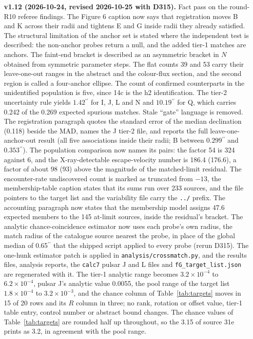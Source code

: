 \documentclass[11pt]{article}
\newcommand{\as}{\ensuremath{^{\prime\prime}}}
\begin{document}
\textbf{v1.12 (2026-10-24, revised 2026-10-25 with D315).} Fact pass on the round-R10 referee findings. The Figure 6 caption now says that registration moves B and K across their radii and tightens E and G inside radii they already satisfied. The structural limitation of the anchor set is stated where the independent test is described: the non-anchor probes return a null, and the added tier-1 matches are anchors. The faint-end bracket is described as an asymmetric bracket in $N$ obtained from symmetric parameter steps. The flat counts 39 and 53 carry their leave-one-out ranges in the abstract and the colour-flux section, and the second region is called a four-anchor ellipse. The count of confirmed counterparts in the unidentified population is five, since 14c is the h2 identification. The tier-2 uncertainty rule yields $1.42\as$ for I, J, L and N and $10.19\as$ for Q, which carries 0.242 of the 0.269 expected spurious matches. Stale ``gate'' language is removed. The registration paragraph quotes the standard error of the median declination (0.118) beside the MAD, names the J tier-2 file, and reports the full leave-one-anchor-out result (all five associations inside their radii; B between $0.299\as$ and $0.353\as$). The population comparison now names its pairs: the factor 54 is 324 against 6, and the X-ray-detectable escape-velocity number is 186.4 (176.6), a factor of about 98 (93) above the magnitude of the matched-limit residual. The encounter-rate undiscovered count is marked as truncated from $-13$, the membership-table caption states that its sums run over 233 sources, and the file pointers to the target list and the variability file carry the \texttt{../} prefix. The accounting paragraph now states that the membership model assigns 47.6 expected members to the 145 at-limit sources, inside the residual's bracket. The analytic chance-coincidence estimator now uses each probe's own radius, the match radius of the catalogue source nearest the probe, in place of the global median of 0.65\as{} that the shipped script applied to every probe (rerun D315). The one-hunk estimator patch is applied in \texttt{analysis/crossmatch.py}, and the results files, analysis reports, the \texttt{calc7} pulsar J and L files and \texttt{fG\_target\_list.json} are regenerated with it. The tier-1 analytic range becomes $3.2\times10^{-4}$ to $6.2\times10^{-4}$, pulsar J's analytic value 0.0055, the pool range of the target list $1.8\times10^{-4}$ to $3.2\times10^{-3}$, and the chance column of Table~\ref{tab:targets} moves in 15 of 20 rows and its $R$ column in three; no rank, rotation or offset value, tier-1 table entry, control number or abstract bound changes. The chance values of Table~\ref{tab:targets} are rounded half up throughout, so the 3.15 of source 31e prints as 3.2, in agreement with the pool range.
\end{document}
